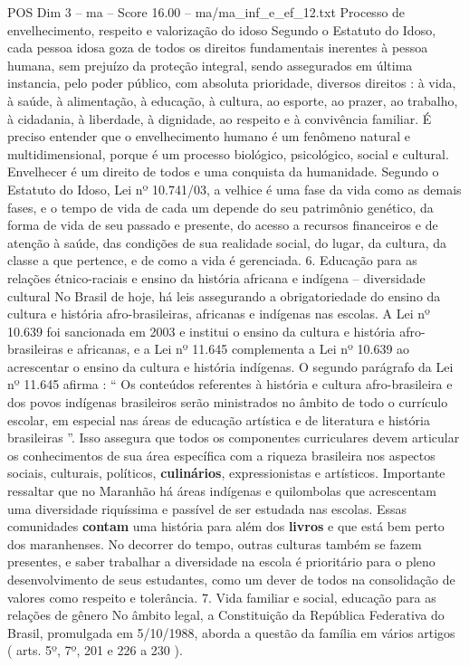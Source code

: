 \begin{textsample}{POS Dim 3 – ma – Score 16.00 – ma/ma\_inf\_e\_ef\_12.txt}
Processo de envelhecimento, respeito e valorização do idoso Segundo o Estatuto do Idoso, cada pessoa idosa goza de todos os direitos fundamentais inerentes à pessoa humana, sem prejuízo da proteção integral, sendo assegurados em última instancia, pelo poder público, com absoluta prioridade, diversos direitos : à vida, à saúde, à alimentação, à educação, à cultura, ao esporte, ao prazer, ao trabalho, à cidadania, à liberdade, à dignidade, ao respeito e à convivência familiar.
É preciso entender que o envelhecimento humano é um fenômeno natural e multidimensional, porque é um processo biológico, psicológico, social e cultural.
Envelhecer é um direito de todos e uma conquista da humanidade.
Segundo o Estatuto do Idoso, Lei nº 10.741/03, a velhice é uma fase da vida como as demais fases, e o tempo de vida de cada um depende do seu patrimônio genético, da forma de vida de seu passado e presente, do acesso a recursos financeiros e de atenção à saúde, das condições de sua realidade social, do lugar, da cultura, da classe a que pertence, e de como a vida é gerenciada. 6.
Educação para as relações étnico-raciais e ensino da história africana e indígena – diversidade cultural No Brasil de hoje, há leis assegurando a obrigatoriedade do ensino da cultura e história afro-brasileiras, africanas e indígenas nas escolas.
A Lei nº 10.639 foi sancionada em 2003 e institui o ensino da cultura e história afro-brasileiras e africanas, e a Lei nº 11.645 complementa a Lei nº 10.639 ao acrescentar o ensino da cultura e história indígenas.
O segundo parágrafo da Lei nº 11.645 afirma : “ Os conteúdos referentes à história e cultura afro-brasileira e dos povos indígenas brasileiros serão ministrados no âmbito de todo o currículo escolar, em especial nas áreas de educação artística e de literatura e história brasileiras ”.
Isso assegura que todos os componentes curriculares devem articular os conhecimentos de sua área específica com a riqueza brasileira nos aspectos sociais, culturais, políticos, \textbf{culinários}, expressionistas e artísticos.
Importante ressaltar que no Maranhão há áreas indígenas e quilombolas que acrescentam uma diversidade riquíssima e passível de ser estudada nas escolas.
Essas comunidades \textbf{contam} uma história para além dos \textbf{livros} e que está bem perto dos maranhenses.
No decorrer do tempo, outras culturas também se fazem presentes, e saber trabalhar a diversidade na escola é prioritário para o pleno desenvolvimento de seus estudantes, como um dever de todos na consolidação de valores como respeito e tolerância. 7.
Vida familiar e social, educação para as relações de gênero No âmbito legal, a Constituição da República Federativa do Brasil, promulgada em 5/10/1988, aborda a questão da família em vários artigos ( arts. 5º, 7º, 201 e 226 a 230 ).

\end{textsample}
